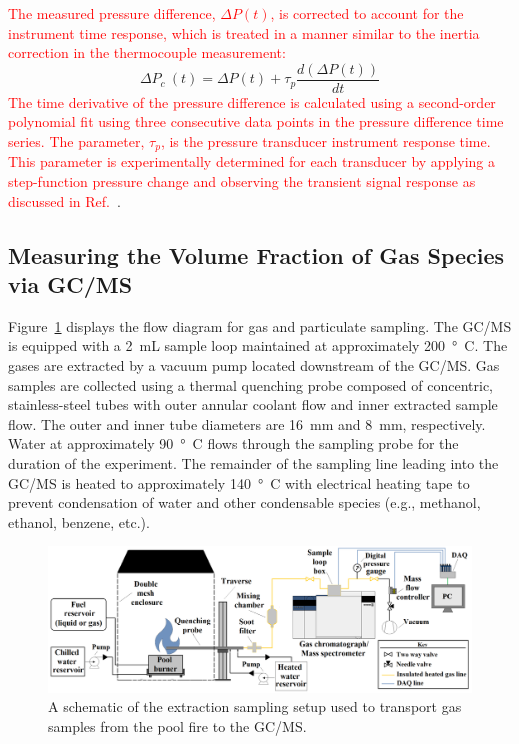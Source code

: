 \documentclass[12pt]{article}
\begin{document}
\textcolor{red}{The measured pressure difference, $\Delta P(t)$, is corrected to account for the instrument time response, which is treated in a manner similar to the inertia correction in the thermocouple measurement:}
\begin{equation}\label{eq:Delta_Pc}
\Delta P_c~(t) = \Delta P(t)+\tau_{p}\frac{d(\Delta P(t))}{dt}
\end{equation}
\textcolor{red}{The time derivative of the pressure difference is calculated using a second-order polynomial fit using three consecutive data points in the pressure difference time series. The parameter, $\tau_p$, is the pressure transducer instrument response time. This parameter is experimentally determined for each transducer by applying a step-function pressure change and observing the transient signal response as discussed in Ref.~\cite{Sung2021}}.

\subsection{Measuring the Volume Fraction of Gas Species via GC/MS}
\label{ssec:Gas_Species_Setup}

Figure~\ref{fig:Experimental_Setup} displays the flow diagram for gas and particulate sampling. The GC/MS is equipped with a 2~mL sample loop maintained at approximately \SI{200}{\degree C}. The gases are extracted by a vacuum pump located downstream of the GC/MS. Gas samples are collected using a thermal quenching probe composed of concentric, stainless-steel tubes with outer annular coolant flow and inner extracted sample flow. The outer and inner tube diameters are \SI{16}{mm} and \SI{8}{mm}, respectively. Water at approximately \SI{90}{\degree C} flows through the sampling probe for the duration of the experiment. The remainder of the sampling line leading into the GC/MS is heated to approximately \SI{140}{\degree C} with electrical heating tape to prevent condensation of water and other condensable species (e.g., methanol, ethanol, benzene, etc.).

\begin{figure}
	\centering
\includegraphics[width=\textwidth,keepaspectratio]{Experimental_Setup.png}
	\caption[A schematic of the gas sampling procedure]{A schematic of the extraction sampling setup used to transport gas samples from the pool fire to the GC/MS.}
	\label{fig:Experimental_Setup}
\end{figure}
\end{document}
